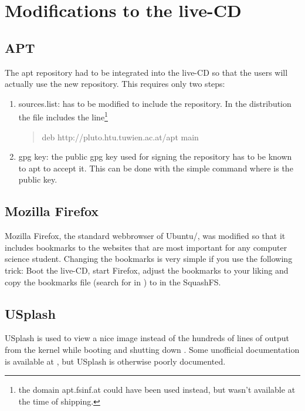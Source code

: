 
\chapter{Modifications to the live-CD}\label{chapter:modifications}

\section{APT}
The \tunix{} apt repository had to be integrated into the \tunix{} live-CD so that
the users will actually use the new repository. This requires only two steps:
\begin{enumerate}
  \item sources.list:  has to be modified to include
    the repository. In the \tunix{} distribution the file includes the
    line\footnote{the domain apt.fsinf.at could have been used instead, but
    wasn't available at the time of shipping.}
    \begin{quote}deb http://pluto.htu.tuwien.ac.at/apt main\end{quote}
  \item gpg key: the public gpg key used for signing the repository has to be
    known to apt to accept it. This can be done with the simple command
     where  is the public key.
\end{enumerate}

\section{Mozilla Firefox}
Mozilla Firefox, the standard webbrowser of Ubuntu/\tunix, was modified so that
it includes bookmarks to the websites that are most important for any computer
science student. Changing the bookmarks is very simple if you use the
following trick: Boot the live-CD, start Firefox, adjust the bookmarks to your
liking and copy the bookmarks file (search for  in
) to  in
the SquashFS.

\section{USplash}
USplash is used to view a nice image instead of the hundreds of lines of output
from the kernel while booting and shutting down \tunix. Some unofficial
documentation is available at \cite{USplashCustomizationHowto}, but USplash is
otherwise poorly documented. 

